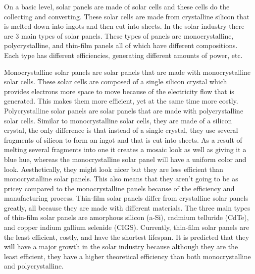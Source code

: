 On a basic level, solar panels are made of solar cells and these cells do the collecting and converting. These solar cells are made from crystalline silicon that is melted down into ingots and then cut into sheets. In the solar industry there are 3 main types of solar panels. These types of panels are monocrystalline, polycrystalline, and thin-film panels all of which have different compositions. Each type has different efficiencies, generating different amounts of power, etc.

Monocrystalline solar panels are solar panels that are made with monocrystalline solar cells. These solar cells are composed of a single silicon crystal which provides electrons more space to move because of the electricity flow that is generated. This makes them more efficient, yet at the same time more costly. Polycrystalline solar panels are solar panels that are made with polycrystalline solar cells. Similar to monocrystalline solar cells, they are made of a silicon crystal, the only difference is that instead of a single crystal, they use several fragments of silicon to form an ingot and that is cut into sheets. As a result of melting several fragments into one it creates a mosaic look as well as giving it a blue hue, whereas the monocrystalline solar panel will have a uniform color and look. Aesthetically, they might look nicer but they are less efficient than monocrystalline solar panels. This also means that they aren’t going to be as pricey compared to the monocrystalline panels because of the efficiency and manufacturing process. Thin-film solar panels differ from crystalline solar panels greatly, all because they are made with different materials. The three main types of thin-film solar panels are amorphous silicon (a-Si), cadmium telluride (CdTe), and copper indium gallium selenide (CIGS). Currently, thin-film solar panels are the least efficient, costly, and have the shortest lifespan. It is predicted that they will have a major growth in the solar industry because although they are the least efficient, they have a higher theoretical efficiency than both monocrystalline and polycrystalline.

